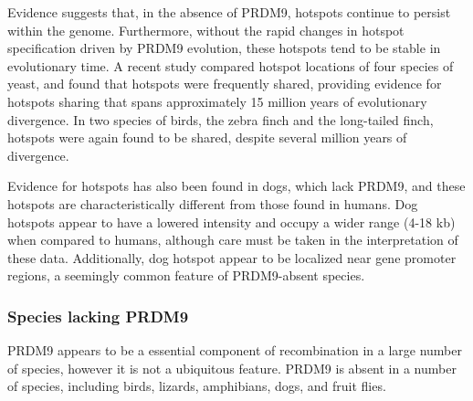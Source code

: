 Evidence suggests that, in the absence of PRDM9, hotspots continue to persist within the genome.
Furthermore, without the rapid changes in hotspot specification driven by PRDM9 evolution, these hotspots tend to be stable in evolutionary time.
A recent study compared hotspot locations of four species of yeast, and found that hotspots were frequently shared, providing evidence for hotspots sharing that spans approximately 15 million years of evolutionary divergence\cite{Lam2015}.
In two species of birds, the zebra finch and the long-tailed finch, hotspots were again found to be shared, despite several million years of divergence\cite{Singhal2015}.

Evidence for hotspots has also been found in dogs, which lack PRDM9, and these hotspots are characteristically different from those found in humans.
Dog hotspots appear to have a lowered intensity and occupy a wider range (4-18 kb)\cite{Axelsson2012,Auton2013} when compared to humans, although care must be taken in the interpretation of these data.
Additionally, dog hotspot appear to be localized near gene promoter regions\cite{Auton2013}, a seemingly common feature of PRDM9-absent species.





\subsubsection{Species lacking PRDM9}

PRDM9 appears to be a essential component of recombination in a large number of species, however it is not a ubiquitous feature.
PRDM9 is absent in a number of species, including birds, lizards, amphibians, dogs, and fruit flies\cite{Ponting2011,Oliver2009}.

